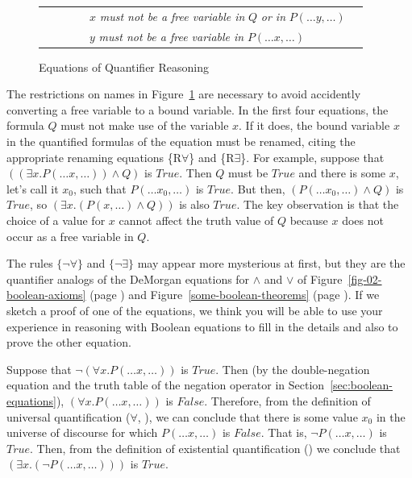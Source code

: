 {\begin{figure}
\begin{center}
\begin{tabular}{ll}
~~~~~~~~$x$ \emph{must not be a free variable in} $Q$ \emph{or in} $P(\dots y, \dots)$     & \\
~~~~~~~~$y$ \emph{must not be a free variable in} $P(\dots x, \dots)$                      & \\
\end{tabular}
\end{center}
\caption{Equations of Quantifier Reasoning}
\label{fig-02-quantifiers}
\end{figure}

The restrictions on names in Figure~\ref{fig-02-quantifiers} are necessary to avoid
accidently converting a free variable to a bound variable.
In the first four equations, the formula $Q$ must not make use of the variable $x$.
If it does, the bound variable $x$ in the quantified formulas of the equation
must be renamed, citing the appropriate renaming equations \{R$\forall$\} and \{R$\exists$\}.
For example,
suppose that $((\exists x.P(\dots x, \dots)) \wedge Q)$ is $True$.
Then $Q$ must be $True$ and there is
some $x$, let's call it $x_0$, such that $P(\dots x_0, \dots)$ is $True$.
But then, $(P(\dots x_0,\dots) \wedge Q)$
is $True$, so $(\exists x.(P(x, \dots) \wedge Q))$ is also $True$.
The key observation is that the choice of a value for $x$
cannot affect the truth value of $Q$ because $x$ does
not occur as a free variable in $Q$.

\label{why-neg-forall}
The rules $\{\neg\forall\}$ and $\{\neg\exists\}$ may appear more mysterious at first,
but they are the quantifier analogs of the DeMorgan equations for $\wedge$ and $\vee$
of Figure~\ref{fig-02-boolean-axioms} (page \pageref{fig-02-boolean-axioms})
and Figure~\ref{some-boolean-theorems} (page \pageref{some-boolean-theorems}).
If we sketch a proof of one of the equations, we think you will be able
to use your experience in reasoning with Boolean equations to fill in the details
and also to prove the other equation.

Suppose that $\neg(\forall x.P(\dots x, \dots))$ is $True$.
Then (by the double-negation equation and the truth table of the negation operator
in Section~\ref{sec:boolean-equations}),  $(\forall x.P(\dots x, \dots))$ is $False$.
Therefore, from the definition of universal quantification
($\forall$, \pageref{def:universal-quantifier}),
we can conclude that there is some value $x_0$ in the universe of discourse for which
$P(\dots x, \dots)$ is $False$. That is, $\neg P(\dots x, \dots)$ is $True$.
Then, from the definition of existential quantification
(\pageref{def:existential-quantifier})
we conclude that $(\exists x.(\neg P(\dots x, \dots)))$ is $True$.

}

